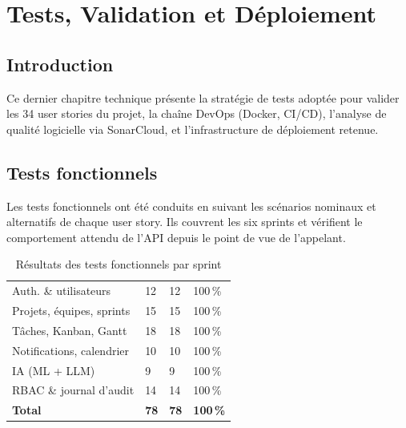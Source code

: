 \chapter{Tests, Validation et Déploiement}

\section{Introduction}

Ce dernier chapitre technique présente la stratégie de tests adoptée pour valider
les 34 user stories du projet, la chaîne DevOps (Docker, CI/CD), l'analyse de
qualité logicielle via SonarCloud, et l'infrastructure de déploiement retenue.

\section{Tests fonctionnels}

Les tests fonctionnels ont été conduits en suivant les scénarios nominaux et
alternatifs de chaque user story. Ils couvrent les six sprints et vérifient le
comportement attendu de l'API depuis le point de vue de l'appelant.

\begin{table}[H]
  \centering
  \caption{Résultats des tests fonctionnels par sprint}
  \label{tab:tests_fonc}
  \begin{tabularx}{\textwidth}{L{5cm}C{2cm}C{2cm}L{3cm}}
    \toprule
     &  &  &  \\
    \midrule
    Auth. \& utilisateurs    & 12 & 12 & 100\,\% \\
    Projets, équipes, sprints & 15 & 15 & 100\,\% \\
    Tâches, Kanban, Gantt    & 18 & 18 & 100\,\% \\
    Notifications, calendrier & 10 & 10 & 100\,\% \\
    IA (ML + LLM)            &  9 &  9 & 100\,\% \\
    RBAC \& journal d'audit   & 14 & 14 & 100\,\% \\
    \midrule
    \textbf{Total} & \textbf{78} & \textbf{78} & \textbf{100\,\%} \\
    \bottomrule
  \end{tabularx}
\end{table}

